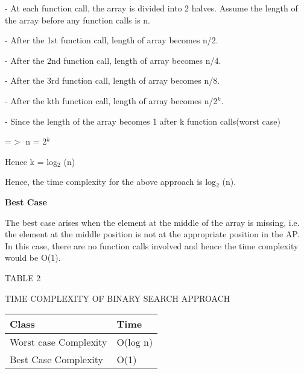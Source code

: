 \documentclass[12pt,a4paper]{article}
\begin{document}
\begin{multicols}{2}
- At each function call, the array is divided into 2 halves. Assume the length of the array before any function calls is n.

- After the 1st function call, length of array becomes n/2.

-  After the 2nd function call, length of array becomes n/4.

-  After the 3rd function call, length of array becomes n/8.

-  After the kth function call, length of array becomes n/2$^{k}$.

-  Since the length of the array becomes 1 after k function calls(worst case) 

=$>$ n = 2$^{k}$

Hence k = log$_{2}$ (n)



Hence, the time complexity for the above approach is log$_{2}$
(n).

\textbf{Best Case }

The best case arises when the element at the middle of the array is missing, i.e. the element at the middle position is not at the appropriate position in the AP. In this case, there are no function calls involved and hence the time complexity would be O(1).


\end{multicols}
\begin{center}TABLE 2\end{center}

\begin{center}TIME COMPLEXITY OF BINARY SEARCH APPROACH\end{center}

\begin{table}[h]
\centering
\begin{tabular}{|l|l|}
\hline
\textbf{Class} & \textbf{Time} \\
\hline
Worst case Complexity & O(log n) \\
\hline
Best Case Complexity & O(1) \\
\hline
\end{tabular}
\end{table}
\end{document}
